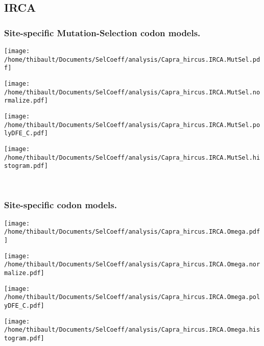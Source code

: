 \subsection{IRCA} 
 
\subsubsection*{Site-specific Mutation-Selection codon models.} 
\begin{minipage}{0.49\linewidth} 
\texttt{[image: /home/thibault/Documents/SelCoeff/analysis/Capra\_hircus.IRCA.MutSel.pdf]} 
\end{minipage}
\begin{minipage}{0.49\linewidth} 
\texttt{[image: /home/thibault/Documents/SelCoeff/analysis/Capra\_hircus.IRCA.MutSel.normalize.pdf]} 
\end{minipage}
\begin{minipage}{0.49\linewidth} 
\texttt{[image: /home/thibault/Documents/SelCoeff/analysis/Capra\_hircus.IRCA.MutSel.polyDFE\_C.pdf]} 
\end{minipage}
\begin{minipage}{0.49\linewidth} 
\texttt{[image: /home/thibault/Documents/SelCoeff/analysis/Capra\_hircus.IRCA.MutSel.histogram.pdf]} 
\end{minipage}
\\ 
\subsubsection*{Site-specific codon models.} 
\begin{minipage}{0.49\linewidth} 
\texttt{[image: /home/thibault/Documents/SelCoeff/analysis/Capra\_hircus.IRCA.Omega.pdf]} 
\end{minipage}
\begin{minipage}{0.49\linewidth} 
\texttt{[image: /home/thibault/Documents/SelCoeff/analysis/Capra\_hircus.IRCA.Omega.normalize.pdf]} 
\end{minipage}
\begin{minipage}{0.49\linewidth} 
\texttt{[image: /home/thibault/Documents/SelCoeff/analysis/Capra\_hircus.IRCA.Omega.polyDFE\_C.pdf]} 
\end{minipage}
\begin{minipage}{0.49\linewidth} 
\texttt{[image: /home/thibault/Documents/SelCoeff/analysis/Capra\_hircus.IRCA.Omega.histogram.pdf]} 
\end{minipage}
\\ 
